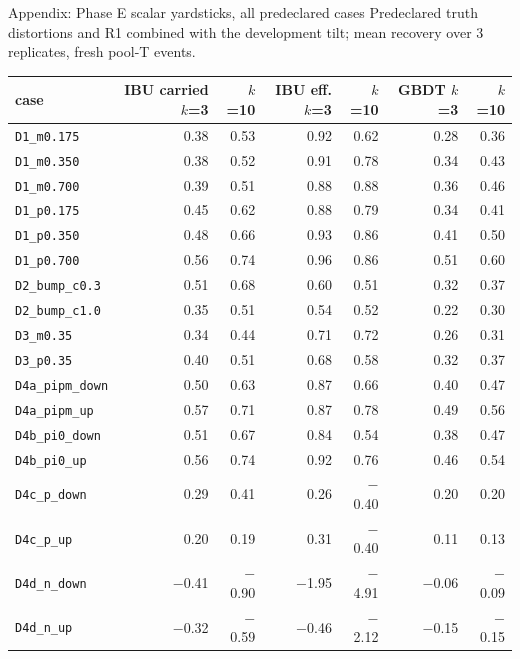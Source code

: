 \documentclass[aspectratio=169,10pt]{beamer}
\def\evidencetext{}
\begin{document}
\gdef\evidencetext{\texttt{phase\_e/results/references.json}}
\begin{frame}{Appendix: Phase E scalar yardsticks, all predeclared cases}
{\small Predeclared truth distortions and R1 combined with the development tilt; mean recovery over 3 replicates,
fresh pool-T events.}
\begin{center}
{\tiny
\begin{tabular}{lrrrrrr}
\toprule
case & IBU carried $k$=3 & $k$=10 & IBU eff. $k$=3 & $k$=10 & GBDT $k$=3 & $k$=10 \\
\midrule
\texttt{D1\_m0.175} & 0.38 & 0.53 & 0.92 & 0.62 & 0.28 & 0.36 \\
\texttt{D1\_m0.350} & 0.38 & 0.52 & 0.91 & 0.78 & 0.34 & 0.43 \\
\texttt{D1\_m0.700} & 0.39 & 0.51 & 0.88 & 0.88 & 0.36 & 0.46 \\
\texttt{D1\_p0.175} & 0.45 & 0.62 & 0.88 & 0.79 & 0.34 & 0.41 \\
\texttt{D1\_p0.350} & 0.48 & 0.66 & 0.93 & 0.86 & 0.41 & 0.50 \\
\texttt{D1\_p0.700} & 0.56 & 0.74 & 0.96 & 0.86 & 0.51 & 0.60 \\
\texttt{D2\_bump\_c0.3} & 0.51 & 0.68 & 0.60 & 0.51 & 0.32 & 0.37 \\
\texttt{D2\_bump\_c1.0} & 0.35 & 0.51 & 0.54 & 0.52 & 0.22 & 0.30 \\
\texttt{D3\_m0.35} & 0.34 & 0.44 & 0.71 & 0.72 & 0.26 & 0.31 \\
\texttt{D3\_p0.35} & 0.40 & 0.51 & 0.68 & 0.58 & 0.32 & 0.37 \\
\texttt{D4a\_pipm\_down} & 0.50 & 0.63 & 0.87 & 0.66 & 0.40 & 0.47 \\
\texttt{D4a\_pipm\_up} & 0.57 & 0.71 & 0.87 & 0.78 & 0.49 & 0.56 \\
\texttt{D4b\_pi0\_down} & 0.51 & 0.67 & 0.84 & 0.54 & 0.38 & 0.47 \\
\texttt{D4b\_pi0\_up} & 0.56 & 0.74 & 0.92 & 0.76 & 0.46 & 0.54 \\
\texttt{D4c\_p\_down} & 0.29 & 0.41 & 0.26 & \ensuremath{-}0.40 & 0.20 & 0.20 \\
\texttt{D4c\_p\_up} & 0.20 & 0.19 & 0.31 & \ensuremath{-}0.40 & 0.11 & 0.13 \\
\texttt{D4d\_n\_down} & \ensuremath{-}0.41 & \ensuremath{-}0.90 & \ensuremath{-}1.95 & \ensuremath{-}4.91 & \ensuremath{-}0.06 & \ensuremath{-}0.09 \\
\texttt{D4d\_n\_up} & \ensuremath{-}0.32 & \ensuremath{-}0.59 & \ensuremath{-}0.46 & \ensuremath{-}2.12 & \ensuremath{-}0.15 & \ensuremath{-}0.15 \\

\end{tabular}}
\end{center}
\end{frame}
\end{document}

